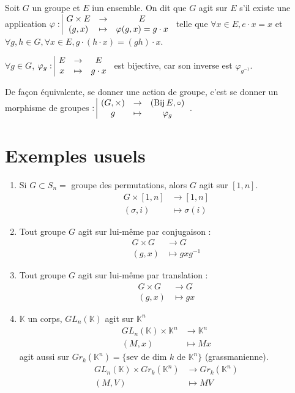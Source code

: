 Soit $G$ un groupe et $E$ iun ensemble. On dit que $G$ agit sur $E$ s'il existe une application 
$\varphi: \space \begin{array}{|ccc} \displaystyle G \times E & \to & \displaystyle E \\ \displaystyle (g,x)  & \mapsto & \displaystyle \varphi(g,x) = g \cdot x \end{array}$ telle que 
$\forall x \in E, e \cdot x = x$ et $\forall g,h \in G, \forall x \in E, g \cdot (h \cdot x) = (gh) \cdot x$.

\begin{remarque}
   $\forall g \in G$, $\varphi_g: \space \begin{array}{|ccc} \displaystyle E & \to & \displaystyle E \\ \displaystyle x & \mapsto & \displaystyle g \cdot x \end{array}$ est bijective, car son inverse est $\varphi_{g^{-1}}$.
\end{remarque}

De façon équivalente, se donner une action de groupe, c'est se donner un morphisme 
de groupes $: \space \begin{array}{|ccc} \displaystyle (G, \times) & \to & \displaystyle (\operatorname{Bij} E, \circ) \\ \displaystyle g & \mapsto & \displaystyle \varphi_g \end{array}$.

\section*{Exemples usuels}

\begin{enumerate}
    \item Si $G \subset S_n =$ groupe des permutations, alors $G$ agit sur $[1,n]$.
    \[
    \begin{aligned}
        G \times [1,n] &\to [1,n] \\
        (\sigma, i) &\mapsto \sigma(i)
    \end{aligned}
    \]

    \item Tout groupe $G$ agit sur lui-même par conjugaison :
    \[
    \begin{aligned}
        G \times G &\to G \\
        (g, x) &\mapsto gxg^{-1}
    \end{aligned}
    \]

    \item Tout groupe $G$ agit sur lui-même par translation :
    \[
    \begin{aligned}
        G \times G &\to G \\
        (g, x) &\mapsto gx
    \end{aligned}
    \]

    \item $\mathbb{K}$ un corps, $GL_n(\mathbb{K})$ agit sur $\mathbb{K}^n$
    \[
    \begin{aligned}
        GL_n(\mathbb{K}) \times \mathbb{K}^n &\to \mathbb{K}^n \\
        (M, x) &\mapsto Mx
    \end{aligned}
    \]
    agit aussi sur $Gr_k(\mathbb{K}^n) = \{ \text{sev de dim } k \text{ de } \mathbb{K}^n \}$ (grassmanienne).
    \[
    \begin{aligned}
        GL_n(\mathbb{K}) \times Gr_k(\mathbb{K}^n) &\to Gr_k(\mathbb{K}^n) \\
        (M, V) &\mapsto MV
    \end{aligned}
    \]
\end{enumerate}


